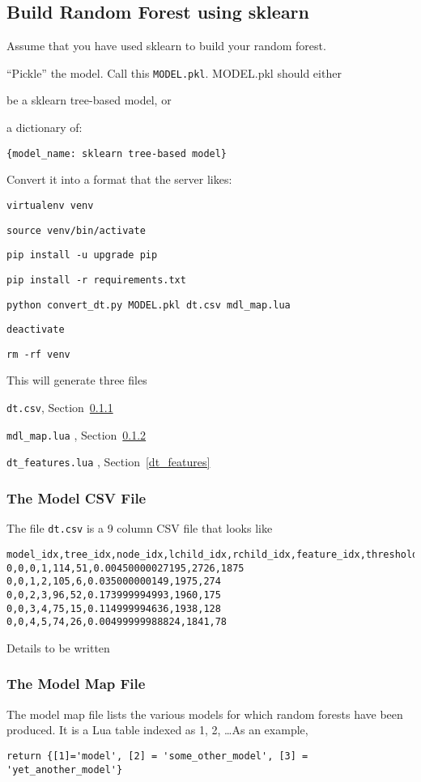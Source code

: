 \subsection{Build Random Forest using sklearn}
Assume that you have used sklearn to build your random forest.
\be
\item ``Pickle'' the model. Call this {\tt MODEL.pkl}.  MODEL.pkl should 
either 
\be
\item be a sklearn tree-based model, or 
\item a dictionary of: \begin{verbatim}
{model_name: sklearn tree-based model}
\end{verbatim}
\ee
\item Convert it into a format that the server likes:
\be
\item \verb+virtualenv venv+
\item \verb+source venv/bin/activate+
\item \verb+pip install -u upgrade pip+
\item \verb+pip install -r requirements.txt+
\item \verb+python convert_dt.py MODEL.pkl dt.csv mdl_map.lua+
\item \verb+deactivate+
\item \verb+rm -rf venv+
\ee
\ee

This will generate three files
\be
\item \verb+dt.csv+, Section~\ref{dt_csv}
\item \verb+mdl_map.lua+ , Section~\ref{mdl_map}
\item \verb+dt_features.lua+ , Section~\ref{dt_features}
\ee

\subsubsection{The Model CSV File}
\label{dt_csv}
The file \verb+dt.csv+ is a 9 column CSV file that looks like
\begin{verbatim}
model_idx,tree_idx,node_idx,lchild_idx,rchild_idx,feature_idx,threshold,neg,pos
0,0,0,1,114,51,0.00450000027195,2726,1875
0,0,1,2,105,6,0.035000000149,1975,274
0,0,2,3,96,52,0.173999994993,1960,175
0,0,3,4,75,15,0.114999994636,1938,128
0,0,4,5,74,26,0.00499999988824,1841,78
\end{verbatim}

Details to be written \TBC

\subsubsection{The Model Map File}
\label{mdl_map}
The model map file lists the various models for which random forests 
have been produced. It is a Lua table indexed as 1, 2, \ldots As an example,
\begin{verbatim}
return {[1]='model', [2] = 'some_other_model', [3] = 'yet_another_model'}
\end{verbatim}

